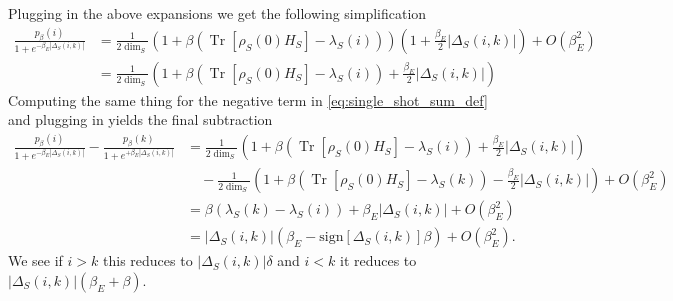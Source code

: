 \documentclass{article}
\newcommand{\parens}[1]{\left( #1 \right)}
\newcommand{\brackets}[1]{\left[ #1 \right]}
\newcommand{\bigo}[1]{O\left( #1 \right)}
\DeclareMathOperator{\Tr}{Tr}
\newcommand{\trace}[1]{\Tr \brackets{ #1 }}
\begin{document}
Plugging in the above expansions we get the following simplification
\begin{align}
    \frac{p_{\beta}(i)}{1 + e^{-\beta_E |\Delta_S(i,k)|}} &= \frac{1}{2\dim_S}\parens{1 + \beta (\trace{\rho_S(0) H_S} - \lambda_S(i))}\parens{1 + \frac{\beta_E}{2}|\Delta_S(i,k)|} + \bigo{\beta_E^2} \\
    &= \frac{1}{2\dim_S}\parens{1 + \beta (\trace{\rho_S(0) H_S} - \lambda_S(i)) + \frac{\beta_E}{2}|\Delta_S(i,k)|}
\end{align}
Computing the same thing for the negative term in \ref{eq:single_shot_sum_def} and plugging in yields the final subtraction
\begin{align}
    \frac{p_{\beta}(i)}{1 + e^{-\beta_E |\Delta_S(i,k)|}} - \frac{p_{\beta}(k)}{1 + e^{+\beta_E |\Delta_S(i,k)|}} &= \frac{1}{2\dim_S}\parens{1 + \beta (\trace{\rho_S(0) H_S} - \lambda_S(i)) + \frac{\beta_E}{2}|\Delta_S(i,k)|} \\
    &\quad - \frac{1}{2\dim_S}\parens{1 + \beta (\trace{\rho_S(0) H_S} - \lambda_S(k)) - \frac{\beta_E}{2}|\Delta_S(i,k)|} + \bigo{\beta_E^2} \\
    &= \beta (\lambda_S(k) - \lambda_S(i)) + \beta_E |\Delta_S(i,k)| +\bigo{\beta_E^2}\\
    &= |\Delta_S(i,k)| \parens{\beta_E - \text{sign} \left[\Delta_S(i,k)\right] \beta} + \bigo{\beta_E^2}.
\end{align}
We see if $i > k$ this reduces to $|\Delta_S(i,k)| \delta$ and $i < k$ it reduces to $|\Delta_S(i,k)| (\beta_E + \beta)$. 
\end{document}
